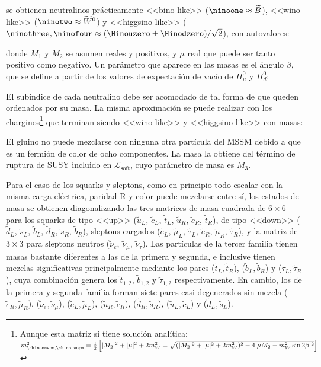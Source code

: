 se obtienen neutralinos prácticamente <<bino-like>> ($\ninoone \approx \widetilde{B}$), <<wino-like>> ($\ninotwo \approx \widetilde{W}^0$) y <<higgsino-like>> ($\ninothree, \ninofour \approx (\Hinouzero \pm \Hinodzero)/\sqrt{2}$), con autovalores:


donde $M_1$ y $M_2$ se asumen reales y positivos, y $\mu$ real que puede ser tanto positivo como negativo. 
Un parámetro que aparece en las masas es el ángulo $\beta$, que se define a partir de los valores de expectación de vacío de $H_u^0$ y $H_d^0$:


El subíndice de cada neutralino debe ser acomodado de tal forma de que queden ordenados por su masa. La misma aproximación se puede realizar con los charginos\footnote{Aunque esta matriz sí tiene solución analítica: \\ $m_{\chinoonepm, \chinotwopm}^2 = \frac{1}{2} \left[ |M_2|^2 + |\mu|^2 + 2 m_W^2 \mp \sqrt{(|M_2|^2 + |\mu|^2 + 2 m_W^2)^2 - 4 |\mu M_2 - m_W^2 \sin{2\beta}|^2} \right]$} que terminan siendo <<wino-like>> y <<higgsino-like>> con masas:





El gluino no puede mezclarse con ninguna otra partícula del MSSM debido a
que es un fermión de color de ocho componentes. La masa la obtiene del término de ruptura de SUSY incluido en $\mathcal{L}_{\text{soft}}$, cuyo parámetro de masa es $M_3$.

Para el caso de los squarks y sleptons, como en principio todo escalar con la misma carga eléctrica, paridad R y color puede mezclarse entre sí, los estados de masa se obtienen diagonalizando las tres matrices de masa cuadrada de $6\times6$ para los squarks de tipo <<up>> ($\tilde{u}_L$, $\tilde{c}_L$, $\tilde{t}_L$, $\tilde{u}_R$, $\tilde{c}_R$, $\tilde{t}_R$), de tipo <<down>> ($\tilde{d}_L$, $\tilde{s}_L$, $\tilde{b}_L$, $\tilde{d}_R$, $\tilde{s}_R$, $\tilde{b}_R$), sleptons cargados ($\tilde{e}_L$, $\tilde{\mu}_L$, $\tilde{\tau}_L$, $\tilde{e}_R$, $\tilde{\mu}_R$, $\tilde{\tau}_R$), y la matriz de $3\times3$ para sleptons neutros ($\tilde{\nu}_e$, $\tilde{\nu}_{\mu}$, $\tilde{\nu}_{\tau}$). Las partículas de la tercer familia tienen masas bastante diferentes a las de la primera y segunda, e inclusive tienen mezclas significativas principalmente mediante los pares ($\tilde{t}_L, \tilde{t}_R$), ($\tilde{b}_L, \tilde{b}_R$) y ($\tilde{\tau}_L, \tilde{\tau}_R$), cuya combinación genera los $\tilde{t}_{1,2}$, $\tilde{b}_{1,2}$ y $\tilde{\tau}_{1,2}$ respectivamente. En cambio, los de la primera y segunda familia forman siete pares casi degenerados sin mezcla ($\tilde{e}_R, \tilde{\mu}_R$), ($\tilde{\nu}_e, \tilde{\nu}_\mu$), ($\tilde{e}_L, \tilde{\mu}_L$), ($\tilde{u}_R, \tilde{c}_R$), ($\tilde{d}_R, \tilde{s}_R$), ($\tilde{u}_L, \tilde{c}_L$) y ($\tilde{d}_L, \tilde{s}_L$).







